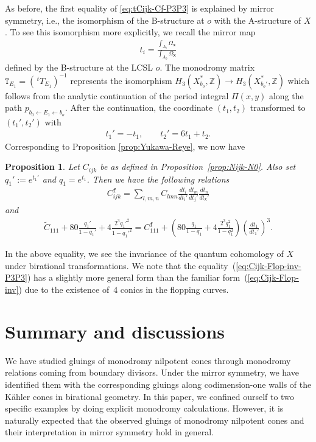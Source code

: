 \documentclass[10pt,a4paper]{amsart}
\numberwithin{equation}{section}
\newtheorem{Proposition}[Theorem]{Proposition}
\begin{document}
As before, the first equality of \eqref{eq:tCijk-Cf-P3P3} is explained by mirror symmetry, i.e., the isomorphism of the B-structure at $o$ with the A-structure of $X$. To see this isomorphism more explicitly, we recall the mirror map
\begin{gather*}
t_{i}=\frac{\int_{A_{i}}\Omega_{\bm{x}}}{\int_{A_{0}}\Omega_{\bm{x}}}
\end{gather*}
defined by the B-structure at the LCSL $o$. The monodromy matrix $\mathtt{T}_{E_{1}}=(\,^{t}T_{E_{1}})^{-1}$ represents the isomorphism $H_{3}(X_{b_{o}}^{*},\mathbb{Z})\to H_{3}(X_{b_{o}'}^{*},\mathbb{Z})$ which follows from the analytic continuation of the period integral $\Pi(x,y)$ along the path $p_{b_{0}\leftarrow E_{1}\leftarrow b_{o}}$. After the continuation, the coordinate $(t_{1},t_{2})$ transformed to $(t_{1}',t_{2}')$ with
\begin{gather*}
t_{1}'=-t_{1},\qquad t_{2}'=6t_{1}+t_{2}.
\end{gather*}
 Corresponding to Proposition \ref{prop:Yukawa-Reye}, we now have
\begin{Proposition}Let $C_{ijk}$ be as defined in Proposition~{\rm \ref{prop:Nijk-N0}}. Also set $q_{1}':=e^{t_{1}'}$ and $q_{1}=e^{t_{1}}$. Then we have the following relations
\begin{gather*}
C_{ijk}^{\mathtt{f}}=\sum_{l,m,n}C_{lmn}\frac{dt_{l}}{dt_{i}'}\frac{dt_{m}}{dt_{j}'}\frac{dt_{n}}{dt_{k}'}
\end{gather*}
and
\begin{gather}
\tilde{C}_{111}+80\frac{q_{1}'}{1-q_{1}'}+4\frac{2^{3}q_{1}'^{2}}{1-q_{1}'^{2}}=C_{111}^{\mathtt{f}}+\left(80\frac{q_{1}}{1-q_{1}}+4\frac{2^{3}q_{1}^{2}}{1-q_{1}^{2}}\right)\left(\frac{dt_{1}}{dt_{1}'}\right)^{3}.\label{eq:Cijk-Flop-inv-P3P3}
\end{gather}
\end{Proposition}

In the above equality, we see the invariance of the quantum cohomology of $X$ under birational transformations. We note that the equality~(\ref{eq:Cijk-Flop-inv-P3P3}) has a slightly more general form than the familiar form~(\ref{eq:Cijk-Flop-inv}) due to the existence of~4 conics in the flopping curves.

\section{Summary and discussions}\label{section6}

We have studied gluings of monodromy nilpotent cones through monodromy relations coming from boundary divisors. Under the mirror symmetry, we have identified them with the corresponding gluings along codimension-one walls of the K\"ahler cones in birational geometry. In this paper, we confined ourself to two specific examples by doing explicit monodromy calculations. However, it is naturally expected that the observed gluings of monodromy nilpotent cones and their interpretation in mirror symmetry hold in general.
\end{document}
